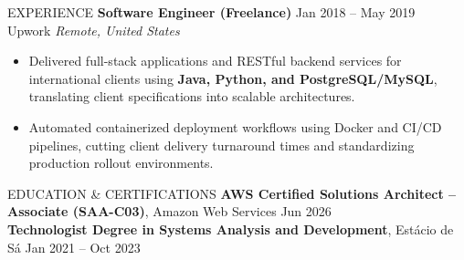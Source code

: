 \documentclass{resume} %
\begin{document}
\begin{rSection}{EXPERIENCE}
\textbf{Software Engineer (Freelance)} \hfill Jan 2018 -- May 2019\\
Upwork \hfill \textit{Remote, United States}
 \begin{itemize}
    \itemsep -5pt \topsep 0pt \parsep 0pt
     \item Delivered full-stack applications and RESTful backend services for international clients using \textbf{Java, Python, and PostgreSQL/MySQL}, translating client specifications into scalable architectures.
     \item Automated containerized deployment workflows using Docker and CI/CD pipelines, cutting client delivery turnaround times and standardizing production rollout environments.
 \end{itemize}

\end{rSection} 


\begin{rSection}{EDUCATION \& CERTIFICATIONS}
\textbf{AWS Certified Solutions Architect -- Associate (SAA-C03)}, Amazon Web Services \hfill {Jun 2026}\\
\textbf{Technologist Degree in Systems Analysis and Development}, Estácio de Sá \hfill {Jan 2021 -- Oct 2023}
\end{rSection}
\end{document}
